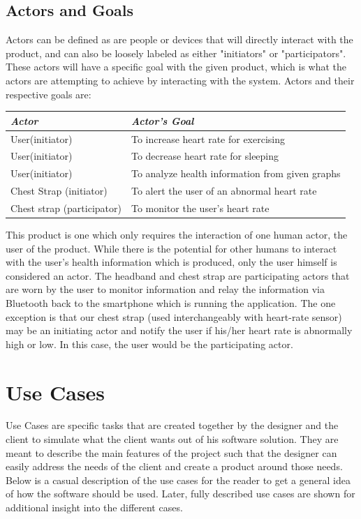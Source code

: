\documentclass[letterpaper,english, 12pt]{scrreprt}
\begin{document}
\subsection{Actors and Goals}
Actors can be defined as are people or devices that will directly interact with the product, and can also be loosely labeled as either "initiators" or "participators". These actors will have a specific goal with the given product, which is what the actors are attempting to achieve by interacting with the system. Actors and their respective goals are:
\begin{center}
	\begin{tabular}{|l|l|}
		\hline
		\emph{Actor} & \emph{Actor's Goal} \\\hline
		User(initiator)& To increase heart rate for exercising\\\hline
		User(initiator)& To decrease heart rate for sleeping\\\hline
		User(initiator)& To analyze health information from given graphs\\\hline
		Chest Strap (initiator) & To alert the user of an abnormal heart rate\\\hline
		Chest strap (participator)& To monitor the user's heart rate\\\hline
	\end{tabular}
\end{center}
This product is one which only requires the interaction of one human actor, the user of the product. While there is the potential for other humans to interact with the user's health information which is produced, only the user himself is considered an actor. The headband and chest strap are participating actors that are worn by the user to monitor information and relay the information via Bluetooth back to the smartphone which is running the application. The one exception is that our chest strap (used interchangeably with heart-rate sensor) may be an initiating actor and notify the user if his/her heart rate is abnormally high or low. In this case, the user would be the participating actor.

\section{Use Cases}
Use Cases are specific tasks that are created together by the designer and the client to simulate what the client wants out of his software solution. They are meant to describe the main features of the project such that the designer can easily address the needs of the client and create a product around those needs. Below is a casual description of the use cases for the reader to get a general idea of how the software should be used. Later, fully described use cases are shown for additional insight into the different cases.
\end{document}
